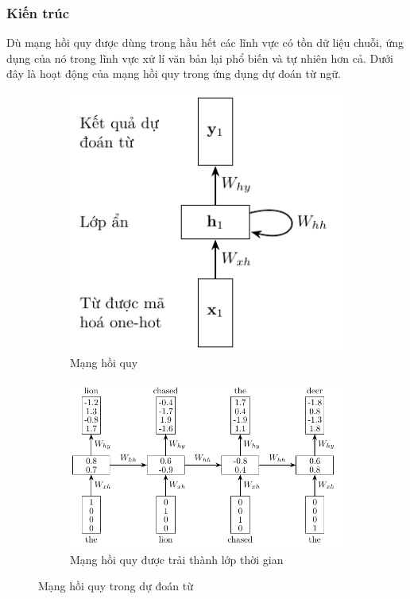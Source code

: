 \subsubsection{Kiến trúc}
Dù mạng hồi quy được dùng trong hầu hết các lĩnh vực có tồn dữ liệu chuỗi, ứng dụng của nó trong lĩnh vực xử lí văn bản lại phổ biến và tự nhiên hơn cả. Dưới đây là hoạt động của mạng hồi quy trong ứng dụng dự đoán từ ngữ.
\begin{figure}[htb]
    \centering
    \begin{subfigure}[t]{0.33\textwidth}
        \centering
        \includegraphics[width=\textwidth]{tikz_image/rnn_example_1a.pdf}
        \caption{Mạng hồi quy}
        \label{figure:rnn-example-a}
    \end{subfigure}
    \begin{subfigure}[t]{0.66\textwidth}
        \centering
        \includegraphics[width=\textwidth]{tikz_image/rnn_example_1b.pdf}
        \caption{Mạng hồi quy được trải thành lớp thời gian}
        \label{figure:rnn-example-b}
    \end{subfigure}
    \caption[Mạng hồi quy trong dự đoán từ]{Mạng hồi quy trong dự đoán từ \cite{Aggarwal2023}}
    \label{figure:rnn-example}
\end{figure}

